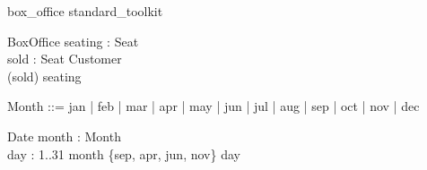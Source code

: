 \begin{zsection}
  \SECTION box_office \parents standard\_toolkit
\end{zsection}

\begin{zed}
\end{zed}


 \begin{schema}{BoxOffice}
  seating : \power Seat \\
  sold : Seat \pfun Customer \\
  \where
  \dom(sold) \subseteq seating
 \end{schema}

\begin{zed}
 Month ::= jan | feb | mar | apr | may | jun | jul | aug | sep | oct | nov | dec
\end{zed}

\begin{schema}{Date}
 month : Month \\
 day : 1..31
  \where
  month \in \{sep, apr, jun, nov\} \implies day 
\end{schema}
